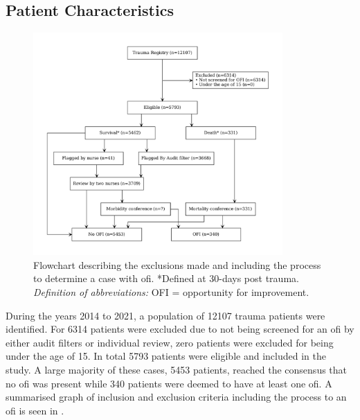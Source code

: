\documentclass[12pt, letterpaper]{article}
\begin{document}
\subsection{Patient Characteristics}
\begin{figure}[h]
    \centering
    \includegraphics[width=0.85\textwidth]{figures/flowchart.pdf}
    \caption{Flowchart describing the exclusions made and including the process to determine a case with \acrshort{ofi}. *Defined at 30-days post trauma. \\
        \textit{Definition of abbreviations:} OFI = opportunity for improvement.}
    \label{fig:flowchart}
\end{figure}
During the years 2014 to 2021, a population of \num{12107} trauma patients were identified. For \num{6314} patients were excluded due to not being screened for an \acrshort{ofi} by either audit filters or individual review, zero patients were excluded for being under the age of 15. In total \num{5793} patients were eligible and included in the study. A large majority of these cases, \num{5453} patients, reached the consensus that no \acrshort{ofi} was present while \num{340} patients were deemed to have at least one \acrshort{ofi}. A summarised graph of inclusion and exclusion criteria including the process to an \acrshort{ofi} is seen in .
\end{document}
